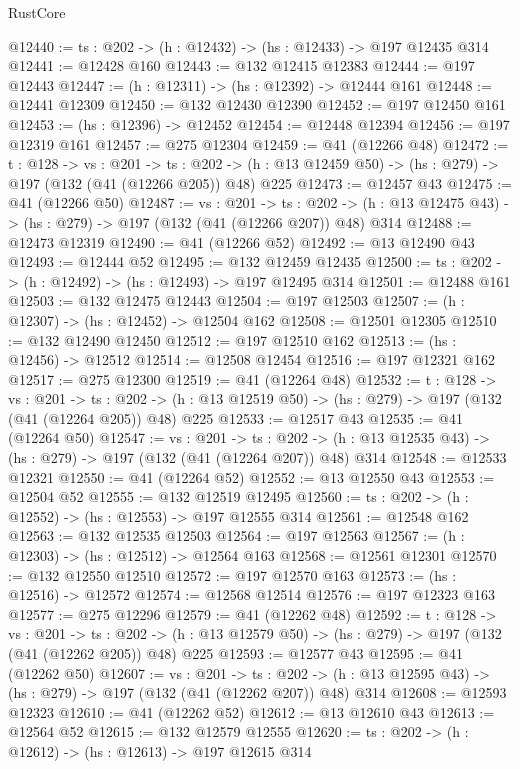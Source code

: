\begin{lexlean}{RustCore}
\begin{coremodule}
@12440 := {ts : @202} -> (h : @12432) -> (hs : @12433) -> @197 @12435 @314
@12441 := @12428 @160
@12443 := @132 @12415 @12383
@12444 := @197 @12443
@12447 := (h : @12311) -> (hs : @12392) -> @12444 @161
@12448 := @12441 @12309
@12450 := @132 @12430 @12390
@12452 := @197 @12450 @161
@12453 := (hs : @12396) -> @12452
@12454 := @12448 @12394
@12456 := @197 @12319 @161
@12457 := @275 @12304
@12459 := @41 (@12266 @48)
@12472 := {t : @128} ->
  {vs : @201} ->
  {ts : @202} -> (h : @13 @12459 @50) -> (hs : @279) -> @197 (@132 (@41 (@12266 @205)) @48) @225
@12473 := @12457 @43
@12475 := @41 (@12266 @50)
@12487 := {vs : @201} ->
  {ts : @202} -> (h : @13 @12475 @43) -> (hs : @279) -> @197 (@132 (@41 (@12266 @207)) @48) @314
@12488 := @12473 @12319
@12490 := @41 (@12266 @52)
@12492 := @13 @12490 @43
@12493 := @12444 @52
@12495 := @132 @12459 @12435
@12500 := {ts : @202} -> (h : @12492) -> (hs : @12493) -> @197 @12495 @314
@12501 := @12488 @161
@12503 := @132 @12475 @12443
@12504 := @197 @12503
@12507 := (h : @12307) -> (hs : @12452) -> @12504 @162
@12508 := @12501 @12305
@12510 := @132 @12490 @12450
@12512 := @197 @12510 @162
@12513 := (hs : @12456) -> @12512
@12514 := @12508 @12454
@12516 := @197 @12321 @162
@12517 := @275 @12300
@12519 := @41 (@12264 @48)
@12532 := {t : @128} ->
  {vs : @201} ->
  {ts : @202} -> (h : @13 @12519 @50) -> (hs : @279) -> @197 (@132 (@41 (@12264 @205)) @48) @225
@12533 := @12517 @43
@12535 := @41 (@12264 @50)
@12547 := {vs : @201} ->
  {ts : @202} -> (h : @13 @12535 @43) -> (hs : @279) -> @197 (@132 (@41 (@12264 @207)) @48) @314
@12548 := @12533 @12321
@12550 := @41 (@12264 @52)
@12552 := @13 @12550 @43
@12553 := @12504 @52
@12555 := @132 @12519 @12495
@12560 := {ts : @202} -> (h : @12552) -> (hs : @12553) -> @197 @12555 @314
@12561 := @12548 @162
@12563 := @132 @12535 @12503
@12564 := @197 @12563
@12567 := (h : @12303) -> (hs : @12512) -> @12564 @163
@12568 := @12561 @12301
@12570 := @132 @12550 @12510
@12572 := @197 @12570 @163
@12573 := (hs : @12516) -> @12572
@12574 := @12568 @12514
@12576 := @197 @12323 @163
@12577 := @275 @12296
@12579 := @41 (@12262 @48)
@12592 := {t : @128} ->
  {vs : @201} ->
  {ts : @202} -> (h : @13 @12579 @50) -> (hs : @279) -> @197 (@132 (@41 (@12262 @205)) @48) @225
@12593 := @12577 @43
@12595 := @41 (@12262 @50)
@12607 := {vs : @201} ->
  {ts : @202} -> (h : @13 @12595 @43) -> (hs : @279) -> @197 (@132 (@41 (@12262 @207)) @48) @314
@12608 := @12593 @12323
@12610 := @41 (@12262 @52)
@12612 := @13 @12610 @43
@12613 := @12564 @52
@12615 := @132 @12579 @12555
@12620 := {ts : @202} -> (h : @12612) -> (hs : @12613) -> @197 @12615 @314

\end{coremodule}
\end{lexlean}

